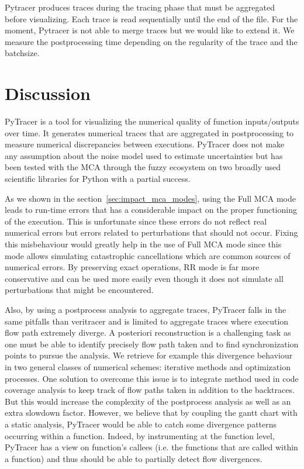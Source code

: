 \documentclass[11pt]{article}
\newcommand{\pytracer}[0]{PyTracer\xspace}
\begin{document}
Pytracer produces traces during the tracing phase that must be aggregated before visualizing.
Each trace is read sequentially until the end of the file. 
For the moment, Pytracer is not able to merge traces but we would like to extend it.
We measure the postprocessing time depending on the regularity of the 
trace and the batchsize.

\section{Discussion}

\pytracer is a tool for visualizing the numerical quality of function inputs/outputs over time.
It generates numerical traces that are aggregated in postprocessing to measure numerical discrepancies between executions.
\pytracer does not make any assumption about the noise model used to estimate uncertainties but has been tested with the MCA 
through the fuzzy ecosystem on two broadly used scientific libraries for Python with a partial success.

As we shown in the section~\ref{sec:impact_mca_modes}, using the Full MCA mode leads to run-time errors
that has a considerable impact on the proper functioning of the execution. This is unfortunate since these
errors do not reflect real numerical errors but errors related to perturbations that should not occur.
Fixing this misbehaviour would greatly help in the use of Full MCA mode since this mode allows simulating catastrophic
cancellations which are common sources of numerical errors. By preserving exact operations, RR mode is far more conservative 
and can be used more easily even though it does not simulate all perturbations that might be encountered.

Also, by using a postprocess analysis to aggregate traces, \pytracer falls in the same pitfalls than veritracer
and is limited to aggregate traces where execution flow path extremely diverge. A posteriori reconstruction
is a challenging task as one must be able to identify precisely flow path taken and to find synchronization points
to pursue the analysis. We retrieve for example this divergence behaviour in two general classes of numerical schemes:
iterative methods and optimization processes. One solution to overcome this issue is to 
integrate method used in code coverage analysis to keep track of flow paths taken in addition to the backtraces.
But this would increase the complexity of the postprocess analysis as well as an extra slowdown factor.
However, we believe that by coupling the gantt chart with a static analysis, \pytracer would be able to catch 
some divergence patterns occurring within a function. Indeed, by instrumenting at the function level, \pytracer 
has a view on function's callees (i.e. the functions that are called within a function) and thus should be able to
partially detect flow divergences.
\end{document}
